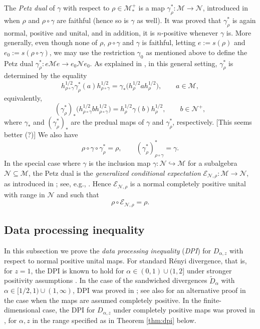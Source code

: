 \documentclass[12pt]{article}
\theoremstyle{definition}
\theoremstyle{remark}
\numberwithin{equation}{section}
\def\cE{\mathcal E}
\def\Me{\mathcal M}
\def\Ne{\mathcal N}
\begin{document}
The \emph{Petz dual} of $\gamma$ with respect to $\rho\in \Me_*^+$ is a map
$\gamma_\rho^*:\Me\to \Ne$, introduced in \cite{petz1988sufficiency} {\color{red}when $\rho$ and
$\rho\circ\gamma$ are faithful (hence so is $\gamma$ as well).} It was proved that
$\gamma_\rho^*$ is again normal, positive and unital, and in addition, it is $n$-positive whenever
$\gamma$ is. More generally, {\color{red}even though none of $\rho$, $\rho\circ\gamma$ and
$\gamma$ is faithful, letting $e:=s(\rho)$ and $e_0:=s(\rho\circ\gamma)$,} we may use the restriction
$\gamma_0$ as mentioned above to define the Petz dual $\gamma^*_\rho: e\Me e\to e_0\Ne e_0$. 
As explained in \cite{jencova2018renyi}, in this general setting, $\gamma^*_\rho$ is determined by
the equality
{\color{red}
\[
h_{\rho\circ\gamma}^{1/2}\gamma_\rho^*(a)h_{\rho\circ\gamma}^{1/2}
=\gamma_*\bigl(h_\rho^{1/2}ah_\rho^{1/2}\bigr),
\qquad a\in\Me,
\]
equivalently,
\begin{equation}\label{eq:petzdual}
(\gamma^*_\rho)_*\bigl(h_{\rho\circ\gamma}^{1/2}bh_{\rho\circ\gamma}^{1/2}\bigr)
=h_\rho^{1/2}\gamma(b)h_\rho^{1/2},\qquad b\in\Ne^+,
\end{equation}
where $\gamma_*$ and $(\gamma^*_\rho)_*$ are the predual maps of $\gamma$ and $\gamma^*_\rho$,
respectively. [This seems better (?)]}
We also have
\begin{equation}\label{eq:petzdual2}
\rho\circ\gamma\circ\gamma^*_\rho=\rho,\qquad (\gamma_\rho^*)_{\rho\circ\gamma}^*=\gamma.
\end{equation}
In the special case where $\gamma$ is the
inclusion map $\gamma: \Ne\hookrightarrow \Me$ for a subalgebra $\Ne\subseteq \Me$, the Petz dual
is the \emph{generalized conditional expectation} $\cE_{\Ne,\rho}:\Me\to \Ne$, as introduced in
\cite{accardi1982conditional}; see, e.g., \cite[Proposition 6.5]{hiai2021quantum}. Hence 
$\cE_{\Ne,\rho}$ is a normal completely positive unital with range in $\Ne$ and such that 
\[
\rho\circ \cE_{\Ne,\rho}=\rho.
\]


\subsection{Data processing inequality}

In this {\color{red}subsection} we prove the \emph{data processing inequality} (\emph{DPI}) for
$D_{\alpha,z}$ with respect to normal positive unital maps. For standard R\'enyi divergence, that is,
for $z=1$, {\color{red}the} DPI is known to hold for $\alpha\in (0,1)\cup (1,2]$ under stronger positivity
assumptions \cite{hiai2018quantum}. In the case of the sandwiched divergences $\tilde D_\alpha$ with
{\color{red}$\alpha\in[1/2,1)\cup(1,\infty)$,} DPI was proved in \cite{jencova2018renyi,jencova2021renyi};
see also \cite{berta2018renyi} for an alternative proof in the case when the maps are assumed
completely positive. In the finite-dimensional case, {\color{red}the DPI for $D_{\alpha,z}$ under completely
positive maps was proved in \cite{zhang2020fromwyd}, for $\alpha,z$ in the range specified as
in Theorem \ref{thm:dpi} below.}
\end{document}
